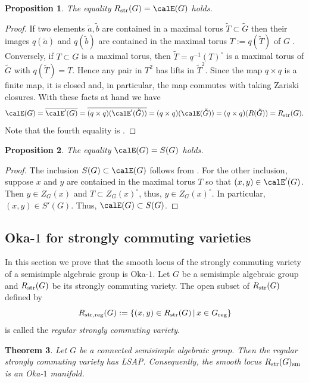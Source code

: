 \documentclass[12pt, a4paper, oneside]{amsart}
\theoremstyle{plain} %
\newtheorem{theorem}{Theorem}
\newtheorem{proposition}[theorem]{Proposition}
\theoremstyle{definition} %
\theoremstyle{remark} %
\begin{document}
\begin{proposition}
The equality $R_{\rm str}(G) = \calE(G)$ holds.
\end{proposition}

\begin{proof}
If two elements $\tilde{a},\tilde{b}$ are contained in a maximal torus $\tilde{T}\subset \tilde{G}$ then their images $q(\tilde{a})$ and $q(\tilde{b})$ are contained in the maximal torus $T:=q(\widetilde{T})$ of $G$ \cite[Proposition 11.4]{Bor91}. Conversely, if $T\subset G$ is a maximal torus, then $\widetilde{T}=q^{-1}(T)^\circ $ is a maximal torus of $\widetilde{G}$ with $q(\widetilde{T})=T$. Hence any pair in $T^2$ has lifts in $\widetilde{T}^2$. Since the map $q\times q$ is a finite map, it is closed and, in particular, the map commutes with taking Zariski closures. With these facts at hand we have
\[\calE(G) = \overline{\calE'(G)}=\overline{(q\times q)(\calE'(\tilde{G}))}=(q\times q)(\calE(\tilde{G})) = (q\times q)(R(\tilde{G}))=R_{\rm str}(G).\]
Note that the fourth equality is \cite[Theorem C]{Ric79}.
\end{proof}




\begin{proposition}
The equality $\calE(G) = S(G)$ holds.
\end{proposition}

\begin{proof}
The inclusion $S(G)\subset \calE(G)$ follows from \cite[\S 3, Theorem B]{Ric79}. For the other inclusion, suppose $x$ and $y$ are contained in the maximal torus $T$ so that $(x,y)\in \calE'(G)$. Then $y\in Z_G(x)$ and $T\subset Z_G(x)^\circ$, thus, $y\in Z_G(x)^\circ$. In particular, $(x,y)\in S'(G)$. Thus, $\calE(G)\subset S(G)$.
\end{proof}

\subsection{Oka-$1$ for strongly commuting varieties}\label{c:Oka1theoremstronglycommutingvarieties}
In this section we prove that the smooth locus of the strongly commuting variety of a semisimple algebraic group is Oka-$1$. Let $G$ be a semisimple algebraic group and $R_{\rm str}(G)$ be its strongly commuting variety. The open subset of $R_{\rm str}(G)$ defined by
\[R_{\rm str,reg}(G):=\{(x,y)\in R_{\rm str}(G)\,|\, x\in G_{\rm reg}\}\]
is called the \emph{regular strongly commuting variety}.
\begin{theorem}\label{thm:strongOka1}
Let $G$ be a connected semisimple algebraic group. Then the regular strongly commuting variety has LSAP. Consequently, the smooth locus $R_{\rm str}(G)_{\rm sm}$ is an Oka-$1$ manifold.
\end{theorem}
\end{document}
